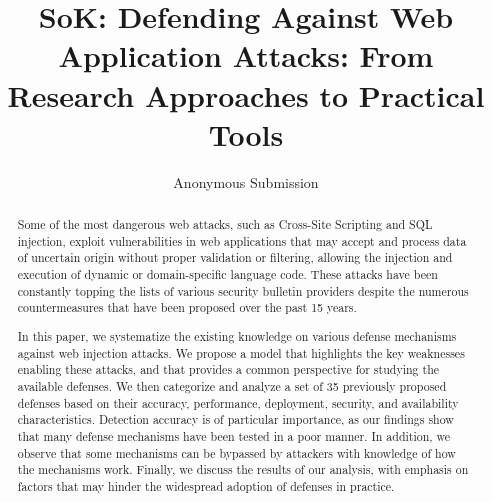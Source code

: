 \documentclass[conference]{IEEEtran}
\date{}
\begin{document}

\author{Anonymous Submission}

\title{SoK: Defending Against Web Application Attacks: From Research
  Approaches to Practical Tools}

\maketitle
\thispagestyle{plain}
\pagestyle{plain}
\begin{abstract}

  Some of the most dangerous web attacks, such as Cross-Site
  Scripting and SQL injection, exploit vulnerabilities
  in web applications that may accept and process
  data of uncertain origin without proper validation or
  filtering, allowing the injection and execution of
  dynamic or domain-specific language code.
  These attacks have been constantly topping the lists of
  various security bulletin providers despite the numerous
  countermeasures that have been proposed over the past 15 years.

  In this paper, we systematize the existing knowledge on
  various defense mechanisms against web injection attacks. We propose
  a model that highlights the key weaknesses enabling these attacks,
  and that provides a common perspective for studying the available defenses.
  We then categorize and analyze a set of 35 previously proposed defenses 
  based on their accuracy, performance,
  deployment, security, and availability characteristics.
  Detection accuracy is of particular importance,
  as our findings show that many defense
  mechanisms have been tested in a poor manner. In addition, we observe
  that some mechanisms can be bypassed by attackers with knowledge
  of how the mechanisms work. Finally, we discuss the results
  of our analysis, with emphasis on factors that may hinder
  the widespread adoption of defenses in practice.

\end{abstract}
\end{document}

